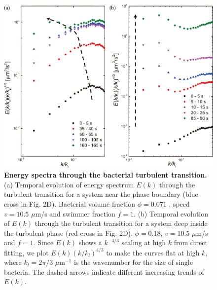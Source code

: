 \begin{figure}[!p]
	\begin{center}
	\includegraphics[width=5.5 in]{Figs/4-Emergence/5.pdf}
	\end{center}
	\caption[Energy Spectra through the Bacterial Turbulent Transition]
	{
	\textbf{Energy spectra through the bacterial turbulent transition.}
   (a) Temporal evolution of energy spectrum $E(k)$ through the turbulent transition for a system near the phase boundary (blue cross in Fig. 2D). Bacterial volume fraction $\phi= 0.071$ , speed $v = 10.5$ $\mu$m/s and swimmer fraction $f = 1$.
   (b) Temporal evolution of $E(k)$ through the turbulent transition for a system deep inside the turbulent phase (red cross in Fig. 2D). $\phi = 0.18$, $v = 10.5$ $\mu$m/s and $f = 1$. Since $E(k)$ shows a $k^{-4/3}$ scaling at high $k$ from direct fitting, we plot $E(k)(k/k_l)^{4/3}$ to make the curves flat at high $k$, where $k_l = 2\pi/3$ $\mu$m$^{-1}$ is the wavenumber for the size of single bacteria. The dashed arrows indicate different increasing trends of $E(k)$.
	}
	\label{fig:4-spectra}
\end{figure}

